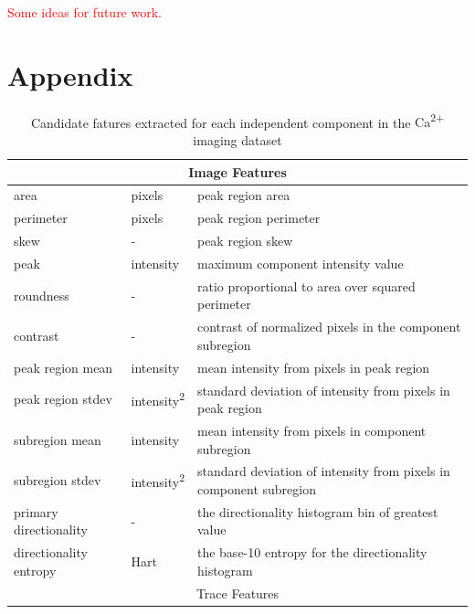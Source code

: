 \documentclass[10pt]{article}
\newcommand{\calcium}[0]{Ca\textsuperscript{2+}}
\newcommand{\todo}[1]{\textcolor{red}{#1}}
\begin{document}
\todo{Some ideas for future work.}

\printbibliography

\newpage

\section*{Appendix}

\begin{table}[h]
  \centering
  \scriptsize
  \caption{Candidate fatures extracted for each independent component in the {\calcium} imaging dataset}
  \label{table:allfeatures}
  \begin{tabular}{lll}
    \toprule
    \multicolumn{3}{c}{Image Features} \\
    \midrule

    area & pixels & peak region area  \\
    \addlinespace[2pt]
    perimeter & pixels & peak region perimeter \\
    \addlinespace[2pt]
    skew & - & peak region skew \\
    \addlinespace[2pt]
    peak & intensity &  maximum component intensity value  \\
    \addlinespace[2pt]
    roundness & - &  ratio proportional to area over squared perimeter\\
    \addlinespace[2pt]
    contrast & - &  contrast of normalized pixels in the component subregion \\
    \addlinespace[2pt]
    peak region mean & intensity &  mean intensity from pixels in peak region \\
    \addlinespace[2pt]
    peak region stdev & intensity\textsuperscript{2} & standard deviation of intensity from pixels in peak region \\
    \addlinespace[2pt]
    subregion mean & intensity &  mean intensity from pixels in component subregion \\
    \addlinespace[2pt]
    subregion stdev & intensity\textsuperscript{2} &  standard deviation of intensity from pixels in component subregion \\
    \addlinespace[2pt]
    primary directionality & - &  the directionality histogram bin of greatest value \\
    \addlinespace[2pt]
    directionality entropy & Hart &  the base-\num{10} entropy for the directionality histogram \\
    
    \midrule
    \multicolumn{3}{c}{Trace Features} \\
    \midrule


\end{tabular}
\end{table}
\end{document}

